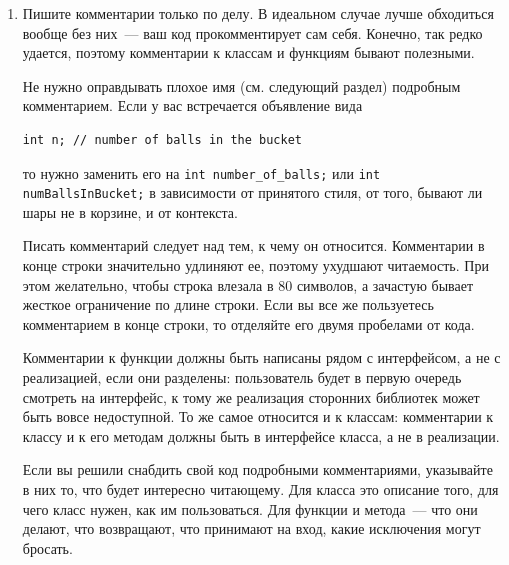\documentclass[a4paper,10pt]{article}
\begin{document}
\begin{enumerate}
    \item Пишите комментарии только по делу. В идеальном случае лучше обходиться
        вообще без них~— ваш код прокомментирует сам себя. Конечно, так редко
        удается, поэтому комментарии к классам и функциям бывают полезными.
        
        Не нужно оправдывать плохое имя (см. следующий раздел) подробным комментарием. Если у вас встречается объявление вида
\begin{lstlisting}
int n; // number of balls in the bucket
\end{lstlisting}
        то нужно заменить его на {\tt int number_of_balls;} или {\tt int
        numBallsInBucket;} в зависимости от принятого стиля, от того, бывают ли
        шары не в корзине, и от контекста.
        
        Писать комментарий следует над тем, к чему он относится. Комментарии в
        конце строки значительно удлиняют ее, поэтому ухудшают читаемость. При
        этом желательно, чтобы строка влезала в 80 символов, а зачастую бывает
        жесткое ограничение по длине строки.
        Если вы все же пользуетесь комментарием в конце строки, то отделяйте его
        двумя пробелами от кода.

        Комментарии к функции должны быть написаны рядом с интерфейсом, а
        не с реализацией, если они разделены: пользователь будет в первую очередь
        смотреть на интерфейс, к тому же реализация сторонних библиотек может
        быть вовсе недоступной. То же самое относится и к классам: комментарии к
        классу и к его методам должны быть в интерфейсе класса, а не в реализации.

        Если вы решили снабдить свой код подробными комментариями, указывайте
        в них то, что будет интересно читающему. Для класса это описание того, для
        чего класс нужен, как им пользоваться. Для функции и метода~— что они
        делают, что возвращают, что принимают на вход, какие исключения могут
        бросать.
       

\end{enumerate}
\end{document}
